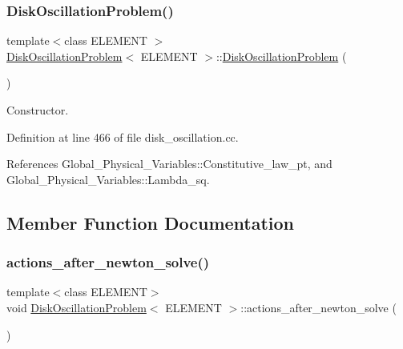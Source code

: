 \subsubsection{\texorpdfstring{Disk\+Oscillation\+Problem()}{DiskOscillationProblem()}}
{\footnotesize\ttfamily template$<$class E\+L\+E\+M\+E\+NT $>$ \\
\hyperlink{classDiskOscillationProblem}{Disk\+Oscillation\+Problem}$<$ E\+L\+E\+M\+E\+NT $>$\+::\hyperlink{classDiskOscillationProblem}{Disk\+Oscillation\+Problem} (\begin{DoxyParamCaption}{ }\end{DoxyParamCaption})}



Constructor. 



Definition at line 466 of file disk\+\_\+oscillation.\+cc.



References Global\+\_\+\+Physical\+\_\+\+Variables\+::\+Constitutive\+\_\+law\+\_\+pt, and Global\+\_\+\+Physical\+\_\+\+Variables\+::\+Lambda\+\_\+sq.



\subsection{Member Function Documentation}
\mbox{\label{classDiskOscillationProblem_a84fdc4311e8cc1fa5f80dc5568c88413}} 
\subsubsection{\texorpdfstring{actions\+\_\+after\+\_\+newton\+\_\+solve()}{actions\_after\_newton\_solve()}}
{\footnotesize\ttfamily template$<$class E\+L\+E\+M\+E\+NT$>$ \\
void \hyperlink{classDiskOscillationProblem}{Disk\+Oscillation\+Problem}$<$ E\+L\+E\+M\+E\+NT $>$\+::actions\+\_\+after\+\_\+newton\+\_\+solve (\begin{DoxyParamCaption}{ }\end{DoxyParamCaption})\hspace{0.3cm}{\ttfamily [inline]}}



